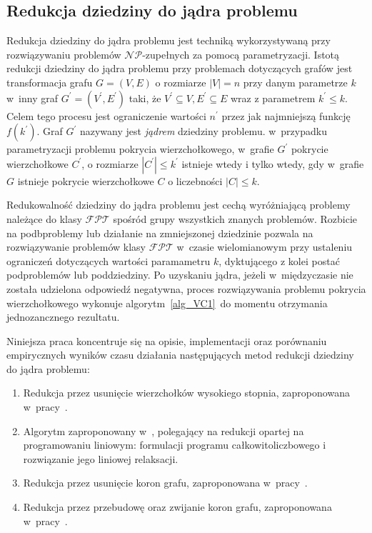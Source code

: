 \subsection{Redukcja dziedziny do jądra problemu}\label{subsection_kernelization}
\par{
  Redukcja dziedziny do jądra problemu jest techniką wykorzystywaną przy
  rozwiązywaniu problemów $\mathcal{NP}$-zupełnych za pomocą parametryzacji.
  Istotą redukcji dziedziny do jądra problemu przy problemach dotyczących grafów
  jest transformacja grafu $G=(V,E)$ o rozmiarze $|V|=n$ przy danym parametrze $k$ w~inny
  graf $G^{\prime}=(V^{\prime}, E^{\prime})$ taki, że $V^{\prime} \subseteq V, E^{\prime} \subseteq E$
  wraz z parametrem $k^{\prime} \leq k$.
  Celem tego procesu jest ograniczenie wartości $n^{\prime}$ przez jak najmniejszą
  funkcję $f(k^{\prime})$.
  Graf $G^{\prime}$ nazywany jest \emph{jądrem} dziedziny problemu.
  w~przypadku parametryzacji problemu pokrycia wierzchołkowego, w~grafie
  $G^{\prime}$ pokrycie wierzchołkowe $C^{\prime}$, o rozmiarze $|C^{\prime}|\leq k^{\prime}$ istnieje wtedy i tylko wtedy, gdy w~grafie $G$ istnieje pokrycie wierzchołkowe $C$ o liczebności $|C| \leq k$.
}
\par{
  Redukowalność dziedziny do jądra problemu jest cechą wyróżniającą problemy 
  należące do klasy $\mathcal{FPT}$ spośród grupy wszystkich znanych problemów.
  Rozbicie na podbproblemy lub działanie na zmniejszonej dziedzinie pozwala na
  rozwiązywanie problemów klasy $\mathcal{FPT}$ w~czasie wielomianowym przy
  ustaleniu ograniczeń dotyczących wartości paramametru $k$, dyktującego z kolei
  postać podproblemów lub poddziedziny.
  Po uzyskaniu jądra, jeżeli w~międzyczasie nie została udzielona odpowiedź negatywna, proces rozwiązywania problemu pokrycia wierzchołkowego
  wykonuje algorytm~\ref{alg_VC1}\ do momentu otrzymania jednozancznego rezultatu.
}
\par{
  Niniejsza praca koncentruje się na opisie, implementacji oraz porównaniu
  empirycznych wyników czasu działania następujących metod redukcji dziedziny do
  jądra problemu:
  \begin{enumerate}
    \item Redukcja przez usunięcie wierzchołków wysokiego stopnia, zaproponowana
      w~pracy~\cite{KernelizationAlgorithms04}.
    \item Algorytm zaproponowany w~\cite{KernelizationAlgorithms04}, polegający
      na redukcji opartej na programowaniu liniowym: formulacji programu
      całkowitoliczbowego i rozwiązanie jego liniowej relaksacji.
    \item Redukcja przez usunięcie koron grafu, zaproponowana
      w~pracy~\cite{abukhzam03}.
    \item Redukcja przez przebudowę oraz zwijanie koron grafu, zaproponowana
      w~pracy~\cite{ImprovedBounds10}.
  \end{enumerate}
}
